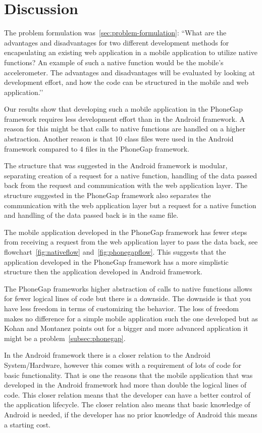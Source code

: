 \chapter{Discussion} \label{ch:discussion}
The problem formulation was~\ref{sec:problem-formulation}:
``What are the advantages and disadvantages for two different development methods for encapsulating an existing web application in a mobile application to utilize native functions? An example of such a native function would be the mobile's accelerometer. The advantages and disadvantages will be evaluated by looking at development effort, and how the code can be structured in the mobile and web application.’’

Our results show that developing such a mobile application in the PhoneGap framework requires less development effort than in the Android framework. A reason for this might be that calls to native functions are handled on a higher abstraction. Another reason is that 10 class files were used in the Android framework compared to 4 files in the PhoneGap framework.

The structure that was suggested in the Android framework is modular, separating creation of a request for a native function, handling of the data passed back from the request and communication with the web application layer. The structure suggested in the PhoneGap framework also separates the communication with the web application layer but a request for a native function and handling of the data passed back is in the same file. 

The mobile application developed in the PhoneGap framework has fewer steps from receiving a request from the web application layer to pass the data back, see flowchart~\ref{fig:nativeflow} and~\ref{fig:phonegapflow}. This suggests that the application developed in the PhoneGap framework has a more simplistic structure then the application developed in Android framework.

The PhoneGap frameworks higher abstraction of calls to native functions allows for fewer logical lines of code but there is a downside. The downside is that you have less freedom in terms of customizing the behavior. The loss of freedom makes no difference for a simple mobile application such the one developed but as Kohan and Montanez points out for a bigger and more advanced application it might be a problem~\ref{subsec:phonegap}. 

In the Android framework there is a closer relation to the Android System/Hardware, however this comes with a requirement of lots of code for basic functionality. That is one the reasons that the mobile application that was developed in the Android framework had more than double the logical lines of code. This closer relation means that the developer can have a better control of the application lifecycle. The closer relation also means that basic knowledge of Android is needed, if the developer has no prior knowledge of Android this means a starting cost. 


